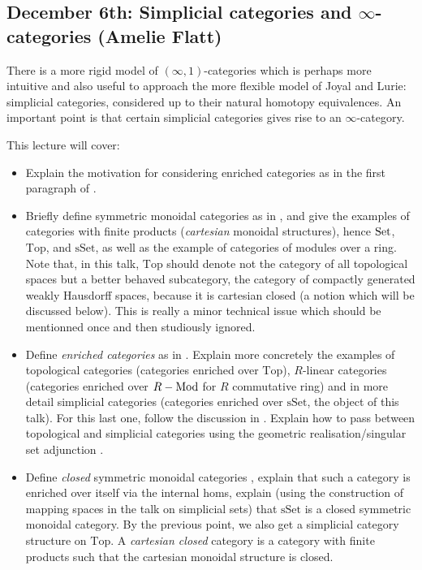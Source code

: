 \documentclass{amsart}
\theoremstyle{definition}
\theoremstyle{remark}
\newcommand{\Mod}{\rm Mod}
\newcommand{\Set}{\mathop{\rm Set}\nolimits}
\newcommand{\Top}{\mathrm{Top}}
\newcommand{\sSet}{\mathrm{sSet}}
\begin{document}
\subsection{December 6th: Simplicial categories and $\infty$-categories (Amelie Flatt)}

There is a more rigid model of $(\infty,1)$-categories which is perhaps more intuitive and also useful to approach the more flexible model of Joyal and Lurie: simplicial categories, considered up to their natural homotopy equivalences. An important point is that certain simplicial categories gives rise to an $\infty$-category.

This lecture will cover:

\begin{itemize}
\item Explain the motivation for considering enriched categories as in the first paragraph of \cite[Chapter 3]{Riehl_cat_hom}.
\item Briefly define symmetric monoidal categories as in \cite[\S 3.1]{Riehl_cat_hom}, and give the examples of categories with finite products (\emph{cartesian} monoidal structures), hence $\Set$, $\Top$, and $\sSet$, as well as the example of categories of modules over a ring. Note that, in this talk, $\Top$ should denote not the category of all topological spaces but a better behaved subcategory, the category of compactly generated weakly Hausdorff spaces, because it is cartesian closed (a notion which will be discussed below). This is really a minor technical issue which should be mentionned once and then studiously ignored.
\item Define \emph{enriched categories} as in \cite[Def. 3.3.1]{Riehl_cat_hom}. Explain more concretely the examples of topological categories (categories enriched over $\Top$), $R$-linear categories (categories enriched over $R-\Mod$ for $R$ commutative ring) and in more detail simplicial categories (categories enriched over $\sSet$, the object of this talk). For this last one, follow the discussion in \cite[\S 3.6]{Riehl_cat_hom}. Explain how to pass between topological and simplicial categories using the geometric realisation/singular set adjunction \cite[end of p.18-top of p.19]{HTT}.
\item Define \emph{closed} symmetric monoidal categories \cite[Def. 3.3.6]{Riehl_cat_hom}, explain that such a category is enriched over itself via the internal homs, explain (using the construction of mapping spaces in the talk on simplicial sets) that $\sSet$ is a closed symmetric monoidal category. By the previous point, we also get a simplicial category structure on $\Top$. A \emph{cartesian closed} category is a category with finite products such that the cartesian monoidal structure is closed.

\end{itemize}
\end{document}
